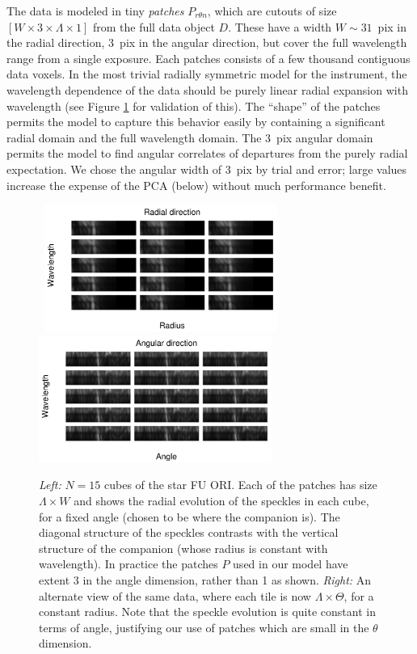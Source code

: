 \documentclass[12pt,pdftex,preprint]{aastex}
\begin{document}
The data is modeled in tiny \emph{patches} $P_{r \theta n}$, which are
cutouts of size $[W\times 3\times\Lambda\times 1]$ from the full data
object $D$.  These have a width $W\sim 31$~pix in the radial direction,
3~pix in the angular direction, but cover the full wavelength range
from a single exposure.  Each patches consists of a few thousand
contiguous data voxels.  In the most trivial radially symmetric model
for the instrument, the wavelength dependence of the data should be
purely linear radial expansion with wavelength (see Figure
\ref{fig:radiustheta} for validation of this).  The ``shape'' of the
patches permits the model to capture this behavior easily by
containing a significant radial domain and the full wavelength domain.
The 3~pix angular domain permits the model to find angular correlates
of departures from the purely radial expectation.  We chose the
angular width of 3~pix by trial and error; large values increase the
expense of the PCA (below) without much performance benefit.


\begin{figure}[h!]
\begin{center}
\mbox{
\includegraphics[width=3.0in]{figs/radius.pdf}
\hspace{5mm}
\includegraphics[width=3.0in]{figs/theta.pdf}
}
\end{center}
\vspace{-7mm}
\caption{{\em Left:} $N=15$ cubes of the star FU ORI. Each of the
  patches has size $\Lambda \times W$ and shows the radial evolution
  of the speckles in each cube, for a fixed angle (chosen to be where
  the companion is). The diagonal structure of the speckles contrasts
  with the vertical structure of the companion (whose radius is
  constant with wavelength). In practice the patches $P$ used in our
  model have extent 3 in the angle dimension, rather than 1 as
  shown. {\em Right:} An alternate view of the same data, where each
  tile is now $\Lambda \times \Theta$, for a constant radius. Note
  that the speckle evolution is quite constant in terms of angle,
  justifying our use of patches which are small in the $\theta$
  dimension. }
\label{fig:radiustheta}
\end{figure}
\end{document}
